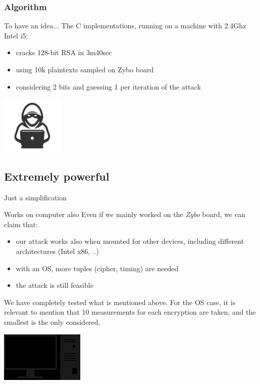 \documentclass[aspectratio=169, handout]{beamer}
\begin{document}
\begin{frame}[fragile]
    \frametitle{Algorithm}
    \begin{block}{To have an idea...}
        The C implementations, running on a machine with 2.4Ghz Intel i5:
        \begin{itemize}
            \pause \item cracks 128-bit RSA in 3m40sec
            \pause \item using 10k plaintexts sampled on Zybo board
            \pause \item considering 2 bits and guessing 1 per iteration of the attack
        \end{itemize}
    \end{block}
    \hfill \includegraphics[width=3cm]{./graphics/hacker}
\end{frame}

\subsection{Extremely powerful}
\begin{frame}{Just a simplification}
	\begin{block}{Works on computer also}
		Even if we mainly worked on the \textit{Zybo} board, we can claim that:
		\begin{itemize}
			\pause \item our attack works also when mounted for other devices, including different architectures (Intel x86, ..)
			\pause \item with an OS, more tuples (cipher, timing) are needed
			\pause \item the attack is still feasible
		\end{itemize}
    We have completely tested what is mentioned above. For the OS case, it is relevant to mention that 10 measurements for each encryption are taken, and the smallest is the only considered.
    \begin{center}
      \includegraphics[width=4cm]{./graphics/pc}
    \end{center}
	\end{block}
\end{frame}
\end{document}
